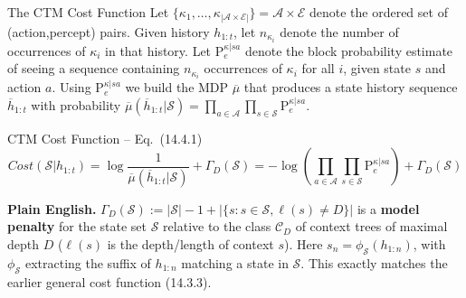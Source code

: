 \documentclass[aspectratio=169,10pt]{beamer}
\newcommand{\Sc}{\mathcal{S}}
\newcommand{\Ac}{\mathcal{A}}
\newcommand{\Ec}{\mathcal{E}}
\begin{document}
\begin{frame}{The CTM Cost Function}
  Let $\{\kappa_1,\ldots,\kappa_{|\Ac\times\Ec|}\}=\Ac\times\Ec$ denote the
  ordered set of (action,percept) pairs. Given history $h_{1:t}$, let
  $n_{\kappa_i}$ denote the number of occurrences of $\kappa_i$ in that
  history. Let $\mathrm{P}_e^{\kappa|sa}$ denote the block probability
  estimate of seeing a sequence containing $n_{\kappa_i}$ occurrences of
  $\kappa_i$ for all $i$, given state $s$ and action $a$. Using
  $\mathrm{P}_e^{\kappa|sa}$ we build the MDP $\overline\mu$ that produces
  a state history sequence $\overline h_{1:t}$ with probability
  $\overline\mu(\overline h_{1:t}|\Sc)=\prod_{a\in\Ac}\prod_{s\in\Sc}\mathrm{P}_e^{\kappa|sa}$.
  \begin{block}{CTM Cost Function -- Eq.\ (14.4.1)}
    \[
      \mathit{Cost}(\Sc|h_{1:t}) = \log\frac{1}{\overline\mu(\overline h_{1:t}|\Sc)} + \Gamma_D(\Sc)
      = -\log\!\left(\prod_{a\in\Ac}\prod_{s\in\Sc}\mathrm{P}_e^{\kappa|sa}\right) + \Gamma_D(\Sc)
    \]
  \end{block}
  \textbf{Plain English.} $\Gamma_D(\Sc):=|\Sc|-1+|\{s:s\in\Sc,\ell(s)\neq D\}|$
  is a \textbf{model penalty} for the state set $\Sc$ relative to the
  class $\mathcal{C}_D$ of context trees of maximal depth $D$
  ($\ell(s)$ is the depth/length of context $s$). Here $s_n=\phi_\Sc(h_{1:n})$,
  with $\phi_\Sc$ extracting the suffix of $h_{1:n}$ matching a state in
  $\Sc$. This exactly matches the earlier general cost function (14.3.3).
\end{frame}
\end{document}
